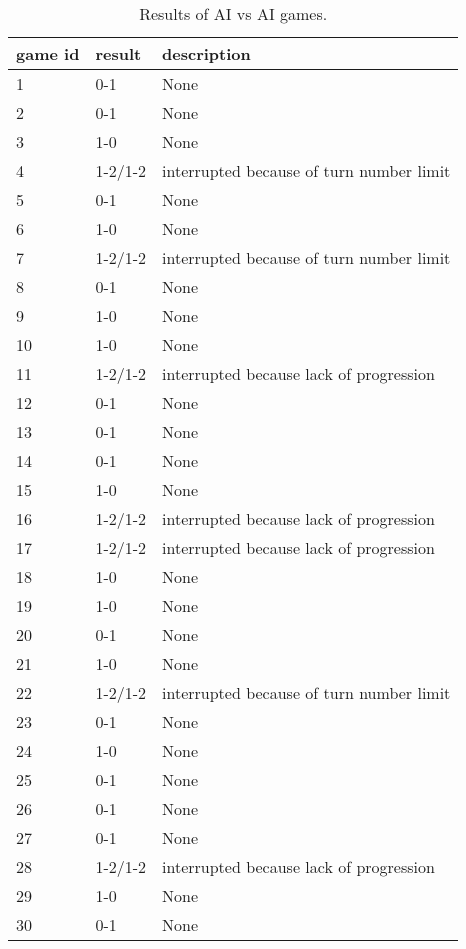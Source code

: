 \begin{table}
	\centering
	\caption{Results of AI vs AI games.}
	\label{tab:ai-vs-ai-results}
	\begin{tabular}{lll}
	\toprule
        \textbf{game id} & \textbf{result} & \textbf{description}\\
		\hline
			1 & 0-1 & None\\
        \hline
			2 & 0-1 & None\\
        \hline
			3 & 1-0 & None\\
        \hline
			4 & 1-2/1-2 & interrupted because of turn number limit\\
        \hline
			5 & 0-1 & None\\
        \hline
			6 & 1-0 & None\\
        \hline
			7 & 1-2/1-2 & interrupted because of turn number limit\\
        \hline
			8 & 0-1 & None\\
        \hline
			9 & 1-0 & None\\
        \hline
			10 & 1-0 & None\\
        \hline
			11 & 1-2/1-2 & interrupted because lack of progression\\
        \hline
			12 & 0-1 & None\\
        \hline
			13 & 0-1 & None\\
        \hline
			14 & 0-1 & None\\
        \hline
			15 & 1-0 & None\\
        \hline
			16 & 1-2/1-2 & interrupted because lack of progression\\
        \hline
			17 & 1-2/1-2 & interrupted because lack of progression\\
        \hline
			18 & 1-0 & None\\
        \hline
			19 & 1-0 & None\\
        \hline
			20 & 0-1 & None\\
        \hline
			21 & 1-0 & None\\
        \hline
			22 & 1-2/1-2 & interrupted because of turn number limit\\
        \hline
			23 & 0-1 & None\\
        \hline
			24 & 1-0 & None\\
        \hline
			25 & 0-1 & None\\
        \hline
			26 & 0-1 & None\\
        \hline
			27 & 0-1 & None\\
        \hline
			28 & 1-2/1-2 & interrupted because lack of progression\\
        \hline
			29 & 1-0 & None\\
        \hline
			30 & 0-1 & None\\
	\end{tabular}
\end{table}
